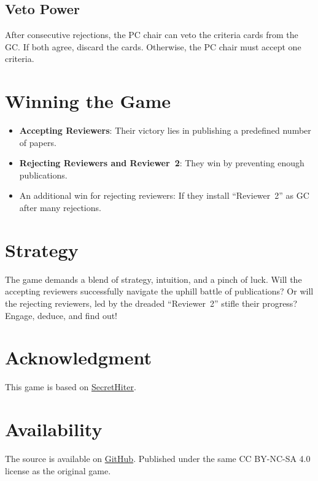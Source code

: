 \documentclass[sigplan,screen,nonacm]{acmart}
\begin{document}
\subsection{Veto Power}

After consecutive rejections, the PC chair can veto the criteria cards from the GC. If both agree, discard the cards. Otherwise, the PC chair must accept one criteria.

\section{Winning the Game}

\begin{itemize}
	\item \textbf{Accepting Reviewers}: Their victory lies in publishing a predefined number of papers.
	\item \textbf{Rejecting Reviewers and Reviewer~2}: They win by preventing enough publications.
	\item An additional win for rejecting reviewers: If they install ``Reviewer~2'' as GC after many rejections.
\end{itemize}

\section*{Strategy}

The game demands a blend of strategy, intuition, and a pinch of luck. Will the accepting reviewers successfully navigate the uphill battle of publications? Or will the rejecting reviewers, led by the dreaded ``Reviewer~2'' stifle their progress? Engage, deduce, and find out!


\section*{Acknowledgment}
This game is based on \href{https://www.secrethitler.com/}{SecretHiter}.

\section*{Availability}
The source is available on \href{https://github.com/ashwinprasadme/SecretReviewer}{GitHub}. Published under the same CC BY-NC-SA 4.0 license as the original game.

%
%
\end{document}
